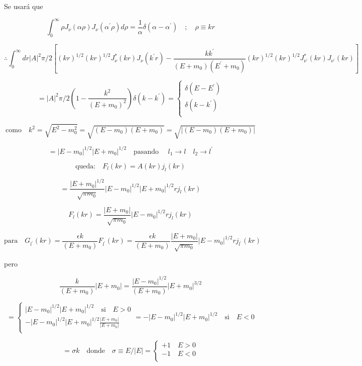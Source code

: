 \documentclass{report}
\begin{document}
Se usará que 

\[\int _{0}^{\infty} \rho J_{\nu} (\alpha \rho )J_{\nu} (\alpha^{\prime} \rho ) d \rho = \frac{1}{\alpha} \delta (\alpha - \alpha ^{\prime}) \quad ; \quad \rho \equiv kr\]

\begin{equation}
\therefore \int _{0}^{\infty } dr |A|^2 \pi /2 [(kr)^{1/2} (kr)^{1/2} J_{\nu}^{*}(kr) J_{\nu} (k^{\prime}r) - \frac{kk^{\prime}}{(E+m_0 )(E^{\prime}+m_0 )}(k r)^{1/2}(kr)^{1/2} J_{\nu^{\prime}}^{*}(kr)J_{\nu^{\prime}}(kr)]
\end{equation} 

\[= |A|^2 \pi/2 (1- \frac{k^2 }{(E+m_0 )^2}) \delta(k-k^{\prime}) = \begin{cases}
    \delta(E-E^{\prime})\\
    \delta(k-k^{\prime}) \\
  \end{cases} \]

\[\text{como} \quad k^2 = \sqrt{E^2 - m_{0}^{2}} = \sqrt{(E-m_0 )(E+m_0 )} = \sqrt{|(E-m_0 )(E+m_0 )|}\]

\[= |E-m_0 |^{1/2} |E+m_0 |^{1/2} \quad \text{pasando } \quad l_{1}\rightarrow l \quad l_{2} \rightarrow l^{\prime}\]

\[\text{queda:} \quad F_l (kr) = A (kr) j_l (kr)\]

\[= \frac{|E+m_0 |^{1/2}}{\sqrt{\pi m_0 }}|E-m_0 |^{1/2} |E+m_0 |^{1/2} r j_l (kr)\]

\begin{equation}
F_l (kr) = \frac{|E+m_0 |}{\sqrt{\pi m_0}} |E-m_0 |^{1/2} r j_{l}(kr)
\end{equation}

\[\text{para} \quad G_{l^{\prime}}(kr) = \frac{\epsilon k}{(E+m_0 )} F_{l^{\prime}} (kr) = \frac{\epsilon k}{(E+m_0 )} \frac{|E+m_0 |}{\sqrt{\pi m_0 }} |E- m_0 |^{1/2} r j_{l^{\prime}} (kr)\]

pero

\[\frac{k}{(E+m_0 )} |E+m_0 | = \frac{|E-m_0 |^{1/2}}{(E+m_0 )} |E+m_0 |^{3/2} \]

\[= \begin{cases}
     |E-m_0 | ^{1/2} |E+m_0 |^{1/2} \quad \text{si} \quad E>0  \\
   - |E-m_0 | ^{1/2} |E+m_0 |^{1/2} \frac{|E+m_0 |}{|E+m_0 |} \\
  \end{cases} = - |E-m_0 | ^{1/2} |E+m_0 |^{1/2} \quad \text{si} \quad E<0 \]

\[= \sigma k \quad \text{donde} \quad \sigma \equiv E/|E| = \begin{cases}
 +1 \quad E>0 \\
 -1 \quad E<0 \\
\end{cases}\]
\end{document}

